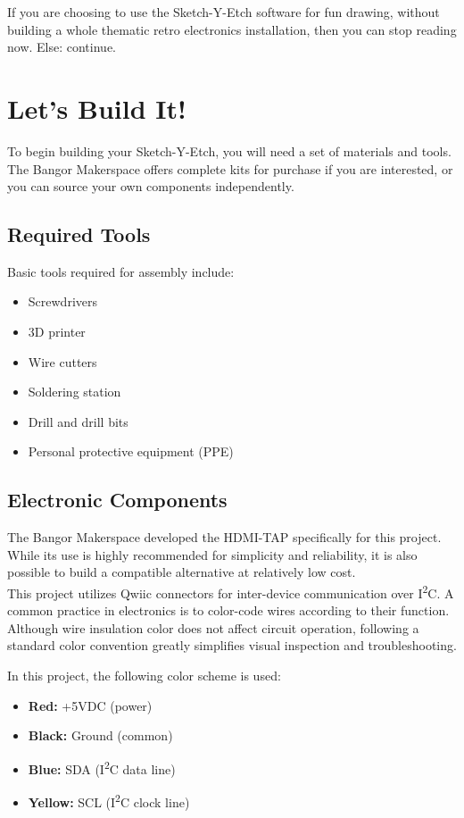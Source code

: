 \documentclass[]{article}
\begin{document}
If you are choosing to use the Sketch-Y-Etch software for fun drawing, without building a whole thematic retro electronics installation, then you can stop reading now. 
Else: continue.

\section*{Let's Build It!}

To begin building your Sketch-Y-Etch, you will need a set of materials and tools.  
The Bangor Makerspace offers complete kits for purchase if you are interested, or you can source your own components independently.

\subsection*{Required Tools}

Basic tools required for assembly include:
\begin{itemize}
	\item Screwdrivers
	\item 3D printer
	\item Wire cutters
	\item Soldering station
	\item Drill and drill bits
	\item Personal protective equipment (PPE)
\end{itemize}

\subsection*{Electronic Components}

The Bangor Makerspace developed the HDMI-TAP specifically for this project. While its use is highly recommended for simplicity and reliability, it is also possible to build a compatible alternative at relatively low cost.\\

This project utilizes Qwiic connectors for inter-device communication over I\textsuperscript{2}C.  
A common practice in electronics is to color-code wires according to their function. Although wire insulation color does not affect circuit operation, following a standard color convention greatly simplifies visual inspection and troubleshooting.

In this project, the following color scheme is used:

\begin{itemize}
	\item \textbf{Red:} +5VDC (power)
	\item \textbf{Black:} Ground (common)
	\item \textbf{Blue:} SDA (I\textsuperscript{2}C data line)
	\item \textbf{Yellow:} SCL (I\textsuperscript{2}C clock line)
\end{itemize}
\end{document}
